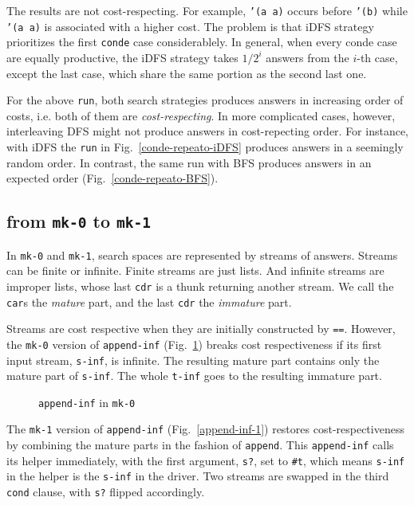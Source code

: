 \documentclass[format=acmlarge, review=true, authordraft=true]{acmart}
\begin{document}
The results are not cost-respecting. For example, \texttt{'(a a)} occurs before
\texttt{'(b)} while \texttt{'(a a)} is associated with a higher cost. 
The problem is that iDFS strategy prioritizes the first \texttt{conde} case
considerablely. In general, when every conde case are equally productive, the iDFS
strategy takes $1/2^{i}$ answers from the $i$-th case, except the last case,
which share the same portion as the second last one.


For the above \texttt{run}, both search strategies produces answers in increasing
order of costs, i.e. both of them are \emph{cost-respecting}. In more complicated
cases, however, interleaving DFS might not produce answers in cost-repecting order.
For instance, with iDFS the \texttt{run} in Fig.~\ref{conde-repeato-iDFS} produces
answers in a seemingly random order. In contrast, the same run with BFS produces
answers in an expected order (Fig.~\ref{conde-repeato-BFS}).



\subsection{from \texttt{mk-0} to \texttt{mk-1}}

In \texttt{mk-0} and \texttt{mk-1}, search spaces are represented by streams of answers. Streams can be finite or infinite. Finite streams are just lists. And infinite streams are improper lists, whose last \texttt{cdr} is a thunk returning another stream. We call the \texttt{car}s the \emph{mature} part, and the last \texttt{cdr} the \emph{immature} part. 

Streams are cost respective when they are initially constructed by \texttt{==}. However, the \texttt{mk-0} version of \texttt{append-inf} (Fig.~\ref{append-inf-0}) breaks cost respectiveness if its first input stream, \texttt{s-inf}, is infinite. The resulting mature part contains only the mature part of \texttt{s-inf}. The whole \texttt{t-inf} goes to the resulting immature part.

\begin{figure}
	 	
	 \caption{\texttt{append-inf} in \texttt{mk-0}}
	 \label{append-inf-0}
\end{figure}

The \texttt{mk-1} version of \texttt{append-inf} (Fig.~\ref{append-inf-1}) restores cost-respectiveness by combining the mature parts in the fashion of \texttt{append}. This \texttt{append-inf} calls its helper immediately, with the first argument, \texttt{s?}, set to \texttt{\#{}t}, which means \texttt{s-inf} in the helper is the \texttt{s-inf} in the driver. Two streams are swapped in the third \texttt{cond} clause, with \texttt{s?} flipped accordingly.
\end{document}
